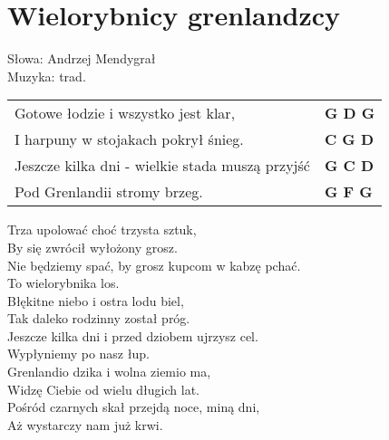 \section{Wielorybnicy grenlandzcy}

Słowa: Andrzej Mendygrał\\
Muzyka:  trad.

\vspace{2em}
\begin{tabular}{@{}p{9cm}@{}l@{}}
Gotowe łodzie i wszystko jest klar, & \bfseries  G D G \\
I harpuny w stojakach pokrył śnieg. & \bfseries C G D \\
Jeszcze kilka dni - wielkie stada muszą przyjść & \bfseries  G C D \\
Pod Grenlandii stromy brzeg. & \bfseries  G F G \\
\end{tabular}

\vspace{1em}
Trza upolować choć trzysta sztuk, \\
By się zwrócił wyłożony grosz. \\
Nie będziemy spać, by grosz kupcom w kabzę pchać. \\
To wielorybnika los. \\

Błękitne niebo i ostra lodu biel, \\
Tak daleko rodzinny został próg. \\
Jeszcze kilka dni i przed dziobem ujrzysz cel. \\
Wypłyniemy po nasz łup. \\

Grenlandio dzika i wolna ziemio ma, \\
Widzę Ciebie od wielu długich lat. \\
Pośród czarnych skał przejdą noce, miną dni, \\
Aż wystarczy nam już krwi. \\